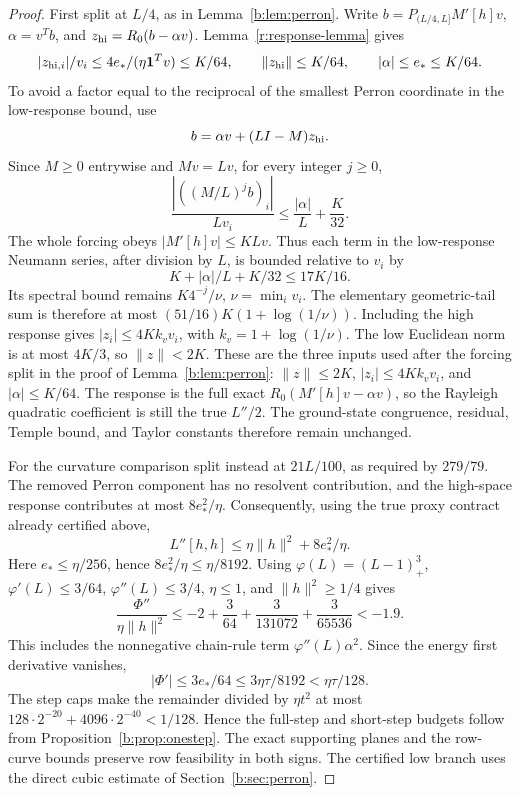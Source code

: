 \documentclass[11pt]{amsart}
\theoremstyle{definition}\newtheorem{definition}[theorem]{Definition}
\theoremstyle{remark}\newtheorem{remark}[theorem]{Remark}
\numberwithin{equation}{section}
\begin{document}
\begin{proof}
First split at $L/4$, as in Lemma~\ref{b:lem:perron}. Write
$b=P_{(L/4,L]}M'[h]v$, $\alpha=v^Tb$, and
$z_{\rm hi}=R_0(b-\alpha v)$. Lemma~\ref{r:response-lemma} gives
\[
 |z_{{\rm hi},i}|/v_i\le4e_*/(\eta\mathbf1^Tv)\le K/64,
 \qquad\|z_{\rm hi}\|\le K/64,\qquad |\alpha|\le e_*\le K/64.
\]
To avoid a factor equal to the reciprocal of the smallest Perron
coordinate in the low-response bound, use
\[
 b=\alpha v+(LI-M)z_{\rm hi}.
\]
Since $M\ge0$ entrywise and $Mv=Lv$, for every integer $j\ge0$,
\[
 \frac{|((M/L)^jb)_i|}{Lv_i}
 \le\frac{|\alpha|}{L}+\frac K{32}.
\]
The whole forcing obeys $|M'[h]v|\le KLv$. Thus each term in the
low-response Neumann series, after division by $L$, is bounded relative
to $v_i$ by
\[
 K+|\alpha|/L+K/32\le17K/16.
\]
Its spectral bound remains $K4^{-j}/\nu$, $\nu=\min_i v_i$.
The elementary geometric-tail sum is therefore at most
$(51/16)K(1+\log(1/\nu))$. Including the high response gives
$|z_i|\le4Kk_vv_i$, with $k_v=1+\log(1/\nu)$.
The low Euclidean norm is at most $4K/3$, so $\|z\|<2K$.
These are the three inputs used after the forcing split in the proof of Lemma~\ref{b:lem:perron}: $\|z\|\le2K$, $|z_i|\le4Kk_vv_i$, and
$|\alpha|\le K/64$. The response is the full exact $R_0(M'[h]v-\alpha v)$,
so the Rayleigh quadratic coefficient is still the true $L''/2$.
The ground-state congruence, residual, Temple bound, and Taylor constants
therefore remain unchanged.

For the curvature comparison split instead at $21L/100$, as required by
$279/79$. The removed Perron component has no resolvent contribution,
and the high-space response contributes at most $8e_*^2/\eta$.
Consequently, using the true proxy contract already certified above,
\[
 L''[h,h]\le \eta\|h\|^2+8e_*^2/\eta.
\]
Here $e_*\le\eta/256$, hence $8e_*^2/\eta\le\eta/8192$.
Using $\varphi(L)=(L-1)_+^3$, $\varphi'(L)\le3/64$,
$\varphi''(L)\le3/4$, $\eta\le1$, and $\|h\|^2\ge1/4$ gives
\[
 \frac{\Phi''}{\eta\|h\|^2}
 \le-2+\frac3{64}+\frac3{131072}+\frac3{65536}<-1.9.
\]
This includes the nonnegative chain-rule term $\varphi''(L)\alpha^2$.
Since the energy first derivative vanishes,
\[
 |\Phi'|\le3e_*/64\le3\eta\tau/8192<\eta\tau/128.
\]
The step caps make the remainder divided by $\eta t^2$ at most
$128\cdot2^{-20}+4096\cdot2^{-40}<1/128$. Hence the full-step and short-step
budgets follow from Proposition~\ref{b:prop:onestep}.
The exact supporting planes and the row-curve bounds preserve row
feasibility in both signs. The certified low branch uses the direct
cubic estimate of Section~\ref{b:sec:perron}.
\end{proof}
\end{document}
